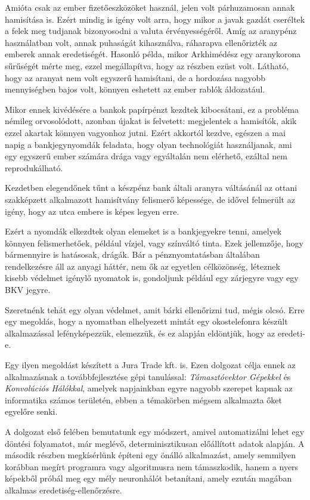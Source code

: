 Amióta csak az ember fizetőeszközöket használ, jelen volt párhuzamosan annak hamisítása is.
Ezért mindig is igény volt arra, hogy mikor a javak gazdát cseréltek a felek meg tudjanak 
bizonyosodni a valuta érvényességéről. Amíg az aranypénz használatban volt, annak puhaságát 
kihasználva, ráharapva ellenőrizték az emberek annak eredetiségét. Hasonló példa, 
mikor Arkhimédész egy aranykorona sűrűségét mérte meg, ezzel megállapítva, hogy az részben ezüst
volt. Látható, hogy az aranyat nem volt egyszerű hamisítani, de a hordozása nagyobb 
mennyiségben bajos volt, könnyen eshetett az ember rablók áldozatául.

Mikor ennek kivédésére a bankok papírpénzt kezdtek kibocsátani, ez a probléma némileg orvosolódott,
azonban újakat is felvetett: megjelentek a hamisítók, akik ezzel akartak könnyen vagyonhoz jutni.
Ezért akkortól kezdve, egészen a mai napig a bankjegynyomdák feladata, hogy olyan
technológiát használjanak, ami egy egyszerű ember számára drága vagy egyáltalán nem elérhető,
ezáltal nem reprodukálható.

Kezdetben elegendőnek tűnt a készpénz bank általi aranyra váltásánál az ottani szakképzett 
alkalmazott hamisítvány felismerő képessége,  de idővel felmerült az igény, hogy az utca embere
is képes legyen erre.

Ezért a nyomdák elkezdtek olyan elemeket is a bankjegyekre tenni, amelyek könnyen felismerhetőek,
például vízjel, vagy színváltó tinta. Ezek jellemzője, hogy bármennyire is hatásosak, drágák.
Bár a pénznyomtatásban általában rendelkezésre áll az anyagi háttér, nem ők az egyetlen
célközönség, léteznek kisebb védelmet igénylő nyomatok is, gondoljunk például egy 
zárjegyre vagy egy BKV jegyre.

Szeretnénk tehát egy olyan védelmet, amit bárki ellenőrizni tud, mégis olcsó. Erre egy megoldás,
hogy a nyomatban elhelyezett mintát egy okostelefonra készült alkalmazással lefényképezzük,
elemezzük, és ez alapján eldöntjük, hogy az eredeti-e.


Egy ilyen megoldást készített a Jura Trade kft. is. Ezen dolgozat célja ennek az alkalmazásnak
a továbbfejlesztése gépi tanulással: \textit{Támasztóvektor Gépekkel} és \textit{Konvolúciós Hálókkal},
amelyek napjainkban egyre nagyobb szerepet kapnak az informatika számos területén, ebben a 
témakörben mégsem alkalmazta őket egyelőre senki.

A dolgozat első felében bemutatunk egy módszert, amivel automatizálni lehet egy döntési folyamatot, már 
meglévő, determinisztikusan előállított adatok alapján. A második részben megkísérlünk építeni egy 
önálló alkalmazást, amely semmilyen korábban megírt programra vagy algoritmusra 
nem támaszkodik, hanem a nyers képekből próbál meg egy mély neuronhálót betanítani, 
amely ezután magában alkalmas eredetiség-ellenőrzésre.


